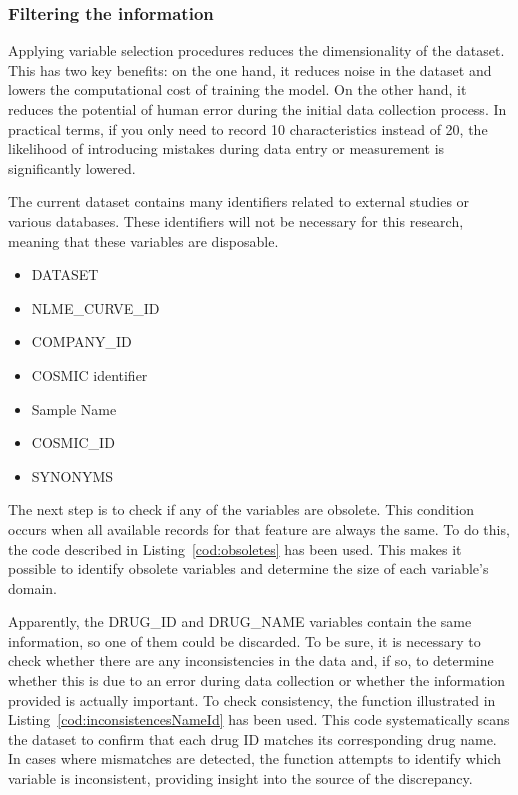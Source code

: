 \subsubsection{Filtering the information}

Applying variable selection procedures reduces the dimensionality of the dataset. This has two key benefits: on the one hand, it reduces noise in the dataset and lowers the computational cost of training the model. On the other hand, it reduces the potential of human error during the initial data collection process. In practical terms, if you only need to record 10 characteristics instead of 20, the likelihood of introducing mistakes during data entry or measurement is significantly lowered.

The current dataset contains many identifiers related to external studies or various databases. These identifiers will not be necessary for this research, meaning that these variables are disposable.

\begin{itemize}
    \item DATASET
    \item NLME\_CURVE\_ID
    \item COMPANY\_ID
    \item COSMIC identifier
    \item Sample Name
    \item COSMIC\_ID
    \item SYNONYMS
\end{itemize}

The next step is to check if any of the variables are obsolete. This condition occurs when all available records for that feature are always the same. To do this, the code described in Listing~\ref{cod:obsoletes} has been used. This makes it possible to identify obsolete variables and determine the size of each variable's domain.

Apparently, the DRUG\_ID and DRUG\_NAME variables contain the same information, so one of them could be discarded. To be sure, it is necessary to check whether there are any inconsistencies in the data and, if so, to determine whether this is due to an error during data collection or whether the information provided is actually important. To check consistency, the function illustrated in Listing~\ref{cod:inconsistencesNameId} has been used. This code systematically scans the dataset to confirm that each drug ID matches its corresponding drug name. In cases where mismatches are detected, the function attempts to identify which variable is inconsistent, providing insight into the source of the discrepancy.

